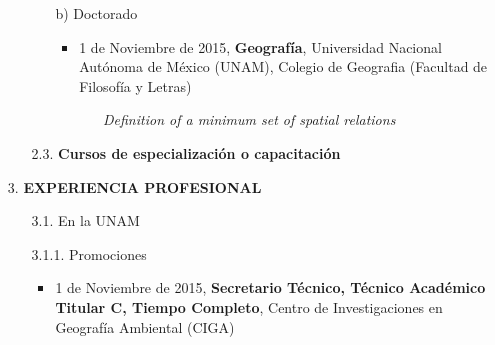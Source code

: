 \documentclass[12pt]{report}
\begin{document}
\begin{enumerate}
\begin{enumerate}
{\begin{itemize}[label=\FilledSmallSquare]
\begin{itemize}
                                        \end{itemize}


                                    \item[b)] Doctorado
                                        \begin{itemize}

                                                \item 1 de Noviembre de 2015,\textbf{ Geografía}, Universidad Nacional Autónoma de México (UNAM), Colegio de Geografia (Facultad de Filosofía y Letras)
                                                    \begin{itemize}
                                                        \item[]{\textit{ Definition of a minimum set of spatial relations }}
                                                    \end{itemize}

                                        \end{itemize}


                            \end{itemize}
                        }


                        \item[2.3.] \textbf{Cursos de especialización o capacitación}
                            \begin{itemize}

                            \end{itemize}

                \end{enumerate}


            \vspace{0.5cm}
            \item[3.] \textbf{EXPERIENCIA PROFESIONAL}
                \begin{enumerate}

                        \item[3.1.] En la UNAM


                            \item[3.1.1.] Promociones
                                \begin{itemize}
                                    \begin{itemize}

                                            \item{ 1 de Noviembre de 2015,\textbf{ Secretario Técnico, Técnico Académico Titular C, Tiempo Completo}, Centro de Investigaciones en Geografía Ambiental (CIGA)}


\end{itemize}
\end{itemize}
\end{enumerate}
\end{enumerate}
\end{document}
